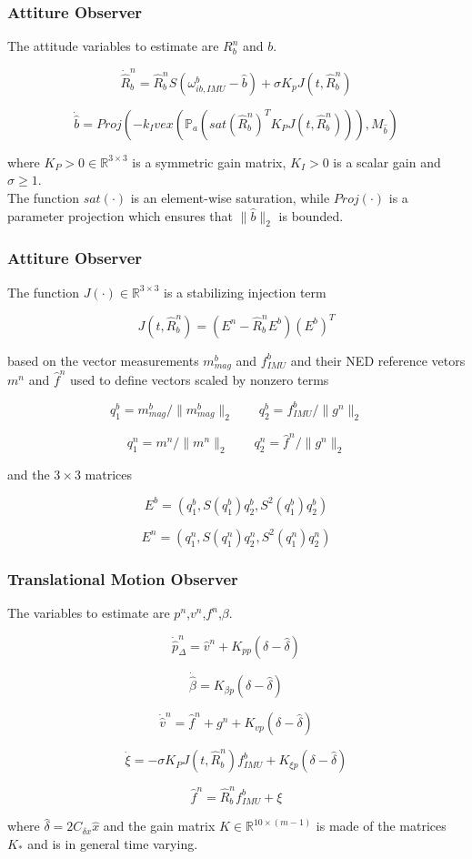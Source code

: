 \documentclass{beamer}
\begin{document}
	\begin{frame}
		\frametitle{Attiture Observer}
		The attitude variables to estimate are $R^n_b$ and $b$.
		
		\[ \dot{\hat{R}}^n_b  =  \hat{R}^n_b S(\omega^b_{ib,IMU} - \hat{b}) + \sigma K_pJ(t, \hat{R}^n_b)       \]
		
		\[ \dot{\hat{b}} = Proj(-k_I vex(\mathds{P}_a (sat(\hat{R}^n_b)^T K_P J(t, \hat{R}^n_b))),M_{\hat{b}} )           \]
		
		where $K_P > 0 \in \mathds{R}^{3\times 3}$ is a symmetric gain matrix, $K_I > 0$ is a scalar gain and $\sigma \geq 1$.\\ 
		
		The function $sat(\cdot)$ is an element-wise saturation, while $Proj(\cdot)$ is a parameter projection which ensures that $\|\hat{b} \|_2$ is bounded.
	\end{frame}

	\begin{frame}
 		\frametitle{Attiture Observer}
 		The function $J(\cdot) \in  \mathds{R}^{3\times 3}$ is a stabilizing injection term
 		
 		\[ J(t, \hat{R}^n_b)  = (E^n - \hat{R}^n_b E^b)(E^b)^T    \]
 		
 		based on the vector measurements $m^b_{mag}$ and $f^b_{IMU}$  and their NED reference vetors $m^n$ and $\hat{f}^n$ used to define vectors scaled by nonzero terms
 		
 		\[ q_1^b = m^b_{mag}/\|m^b_{mag}\|_2 \qquad q_2^b = f^b_{IMU}/\|g^n\|_2    \]
 		
 		\[ q_1^n = m^n/\|m^n\|_2 \qquad q_2^n = \hat{f}^n/\|g^n\|_2    \]
 		
 		and the $3\times3$ matrices
 		
 		\[ E^b = (q_1^b, S(q^b_1)q_2^b, S^2(q_1^b)q_2^b)    \]
 		
 		\[ E^n = (q_1^n, S(q^n_1)q_2^n, S^2(q_1^n)q_2^n)    \]
	\end{frame}


	\begin{frame}
		\frametitle{Translational Motion Observer}
		The variables to estimate are $p^n$,$v^n$,$f^n$,$\beta$.
		
		\[ \dot{\hat{p}}^n_\Delta = \hat{v}^n + K_{pp}(\delta - \hat{\delta})  \]
		
		\[ \dot{\hat{\beta}} = K_{\beta p} (\delta - \hat{\delta}) \]
		
		\[ \dot{\hat{v}}^n = \hat{f}^n + g^n + K_{vp}(\delta - \hat{\delta})\]
		
		\[ \dot{\xi} = - \sigma K_P J(t, \hat{R}^n_b)f^b_{IMU} + K_{\xi p}(\delta - \hat{\delta}) \]
		
		\[ \hat{f}^n = \hat{R}^n_b f^b_{IMU} + \xi  \]
		
		where $\hat{\delta} = 2C_{\delta x}\hat{x}$ and the gain matrix $K \in \mathds{R}^{10\times(m-1)}$ is made of the matrices $K_*$ and is in general time varying.
	\end{frame}
\end{document}
